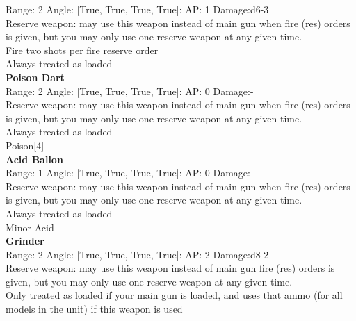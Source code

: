 Range: 2  Angle: [True, True, True, True]: AP: 1 Damage:d6-3 \\
Reserve weapon: may use this weapon instead of main gun when fire (res) orders is given, but you may only use one reserve weapon at any given time.\\ 
Fire two shots per fire reserve order\\ 
Always treated as loaded\\ 




{\bf Poison Dart } \\



Range: 2  Angle: [True, True, True, True]: AP: 0 Damage:- \\
Reserve weapon: may use this weapon instead of main gun when fire (res) orders is given, but you may only use one reserve weapon at any given time.\\ 
Always treated as loaded\\ 
Poison[4]\\ 




{\bf Acid Ballon } \\



Range: 1  Angle: [True, True, True, True]: AP: 0 Damage:- \\
Reserve weapon: may use this weapon instead of main gun when fire (res) orders is given, but you may only use one reserve weapon at any given time.\\ 
Always treated as loaded\\ 
Minor Acid\\ 




{\bf Grinder } \\



Range: 2  Angle: [True, True, True, True]: AP: 2 Damage:d8-2 \\
Reserve weapon: may use this weapon instead of main gun fire (res) orders is given, but you may only use one reserve weapon at any given time.\\ 
Only treated as loaded if your main gun is loaded, and uses that ammo (for all models in the unit) if this weapon is used\\ 




 
\ \\

